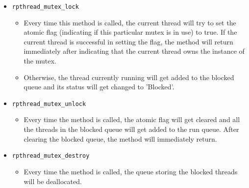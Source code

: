 \documentclass{article}
\begin{document}
\begin{itemize}
    \item \texttt{rpthread\_mutex\_lock}
    \begin{itemize}
      \item[] Every time this method is called, the current thread will try to set the atomic flag (indicating if this particular mutex is in use) to true. If the current thread is successful in setting the flag, the method will return immediately after indicating that the current thread owns the instance of the mutex. 
      \item[] Otherwise, the thread currently running will get added to the blocked queue and its status will get changed to 'Blocked'. 
    \end{itemize}
    
    \item \texttt{rpthread\_mutex\_unlock}
    \begin{itemize}
      \item[] Every time the method is called, the atomic flag will get cleared and all the threads in the blocked queue will get added to the run queue. After clearing the blocked queue, the method will immediately return.
    \end{itemize}
    
    \item \texttt{rpthread\_mutex\_destroy}
    \begin{itemize}
      \item[] Every time the method is called, the queue storing the blocked threads will be deallocated.
    \end{itemize}
\end{itemize}
\end{document}
